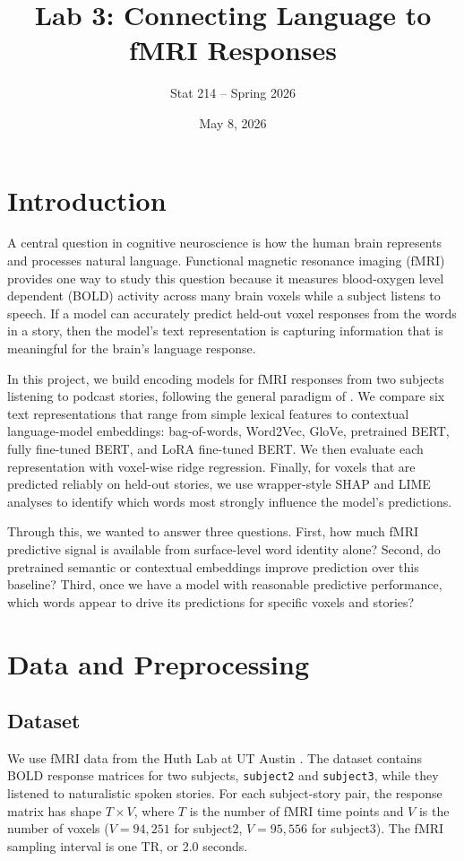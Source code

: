 \documentclass[11pt]{article}
\title{Lab 3: Connecting Language to fMRI Responses}
\author{Stat 214 -- Spring 2026}
\date{May 8, 2026}
\begin{document}
\maketitle

\section{Introduction}
A central question in cognitive neuroscience is how the human brain represents and processes natural language. Functional magnetic resonance imaging (fMRI) provides one way to study this question because it measures blood-oxygen level dependent (BOLD) activity across many brain voxels while a subject listens to speech. If a model can accurately predict held-out voxel responses from the words in a story, then the model's text representation is capturing information that is meaningful for the brain's language response.

In this project, we build encoding models for fMRI responses from two subjects listening to podcast stories, following the general paradigm of \citet{jain2018}. We compare six text representations that range from simple lexical features to contextual language-model embeddings: bag-of-words, Word2Vec, GloVe, pretrained BERT, fully fine-tuned BERT, and LoRA fine-tuned BERT. We then evaluate each representation with voxel-wise ridge regression. Finally, for voxels that are predicted reliably on held-out stories, we use wrapper-style SHAP and LIME analyses to identify which words most strongly influence the model's predictions.

Through this, we wanted to answer three questions. First, how much fMRI predictive signal is available from surface-level word identity alone? Second, do pretrained semantic or contextual embeddings improve prediction over this baseline? Third, once we have a model with reasonable predictive performance, which words appear to drive its predictions for specific voxels and stories?

\section{Data and Preprocessing}
\subsection{Dataset}
We use fMRI data from the Huth Lab at UT Austin \citep{jain2018}. The dataset contains BOLD response matrices for two subjects, \texttt{subject2} and \texttt{subject3}, while they listened to naturalistic spoken stories. For each subject-story pair, the response matrix has shape $T \times V$, where $T$ is the number of fMRI time points and $V$ is the number of voxels ($V = 94{,}251$ for subject2, $V = 95{,}556$ for subject3). The fMRI sampling interval is one TR, or 2.0 seconds.
\end{document}
